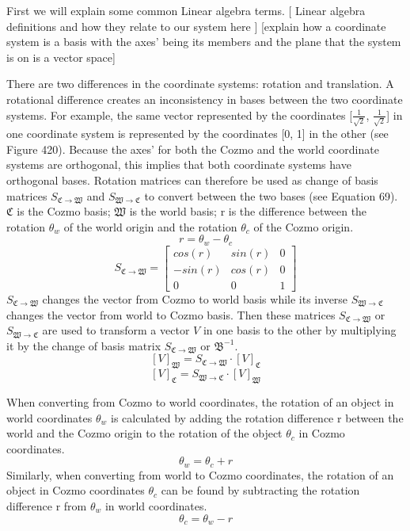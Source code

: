 \documentclass[jou,apacite]{apa6}
\begin{document}
First we will explain some common Linear algebra terms. 
[ Linear algebra definitions and how they relate to our system here ]
[explain how a coordinate system is a basis with the axes’ being its members and the plane that the system is on is a vector space]

There are two differences in the coordinate systems: rotation and translation. A rotational difference creates an inconsistency in bases between the two coordinate systems. For example, the same vector represented by the coordinates [$\frac{1}{\sqrt2}$, $\frac{1}{\sqrt2}$] in one coordinate system is represented by the coordinates [0, 1] in the other (see Figure 420). Because the axes’ for both the Cozmo and the world coordinate systems are orthogonal, this implies that both coordinate systems have orthogonal bases. Rotation matrices can therefore be used as change of basis matrices $S_{\mathfrak{C}\rightarrow\mathfrak{W}}$ and $S_{\mathfrak{W}\rightarrow\mathfrak{C}}$ to convert between the two bases (see Equation 69). $\mathfrak{C}$ is the Cozmo basis; $\mathfrak{W}$ is the world basis; r is the difference between the rotation $\theta_w$ of the world origin and the rotation $\theta_c$ of the Cozmo origin.
$$r = \theta_w - \theta_c$$
\[
S_{\mathfrak{C}\rightarrow\mathfrak{W}}=
\begin{bmatrix}
cos(r) & sin(r) & 0 \\
-sin(r) & cos(r) & 0 \\
0 & 0 & 1
\end{bmatrix}
\]
$S_{\mathfrak{C}\rightarrow\mathfrak{W}}$ changes the vector from Cozmo to world basis while its inverse $S_{\mathfrak{W}\rightarrow\mathfrak{C}}$ changes the vector from world to Cozmo basis.
 Then these matrices $S_{\mathfrak{C}\rightarrow\mathfrak{W}}$ or $S_{\mathfrak{W}\rightarrow\mathfrak{C}}$ are used to transform a vector $V$ in one basis to the other by multiplying it by the change of basis matrix $S_{\mathfrak{C}\rightarrow\mathfrak{W}}$ or $\mathfrak{B}^{-1}$.
 $$[V]_\mathfrak{W} = S_{\mathfrak{C}\rightarrow\mathfrak{W}} \cdot [V]_\mathfrak{C}$$
 $$[V]_\mathfrak{C} = S_{\mathfrak{W}\rightarrow\mathfrak{C}} \cdot [V]_\mathfrak{W}$$

When converting from Cozmo to world coordinates, the rotation of an object in world coordinates $\theta_w$ is calculated by adding the rotation difference r between the world and the Cozmo origin to the rotation of the object $\theta_c$ in Cozmo coordinates.
$$\theta_w = \theta_c + r$$
Similarly, when converting from world to Cozmo coordinates, the rotation of an object in Cozmo coordinates $\theta_c$ can be found by subtracting the rotation difference r from $\theta_w$ in world coordinates.
$$\theta_c = \theta_w - r$$
\end{document}
